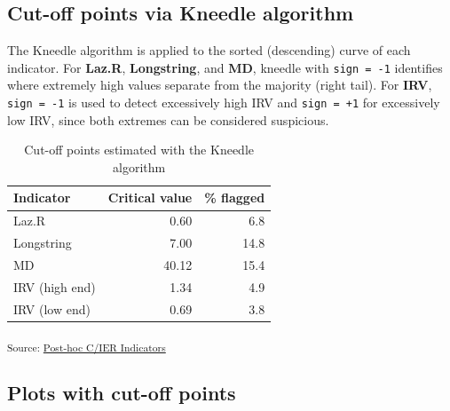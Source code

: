 \documentclass[
  letterpaper,
  DIV=11,
  numbers=noendperiod]{scrartcl}
\begin{document}
\subsection{Cut-off points via Kneedle
algorithm}\label{cut-off-points-via-kneedle-algorithm}

The Kneedle algorithm is applied to the sorted (descending) curve of
each indicator. For \textbf{Laz.R}, \textbf{Longstring}, and
\textbf{MD}, kneedle with \texttt{sign\ =\ -1} identifies where
extremely high values separate from the majority (right tail). For
\textbf{IRV}, \texttt{sign\ =\ -1} is used to detect excessively high
IRV and \texttt{sign\ =\ +1} for excessively low IRV, since both
extremes can be considered suspicious.

{

\begin{longtable}[]{@{}lrr@{}}

\caption{\label{tbl-kneedle-cutoffs}Cut-off points estimated with the
Kneedle algorithm}

\tabularnewline

\toprule\noalign{}
Indicator & Critical value & \% flagged \\
\midrule\noalign{}
\endhead
\bottomrule\noalign{}
\endlastfoot
Laz.R & 0.60 & 6.8 \\
Longstring & 7.00 & 14.8 \\
MD & 40.12 & 15.4 \\
IRV (high end) & 1.34 & 4.9 \\
IRV (low end) & 0.69 & 3.8 \\

\end{longtable}

}

\textsubscript{Source:
\href{https://phdpablo.github.io/cier/Scripts/ProcessingScripts/02_posthoc-preview.html\#cell-tbl-kneedle-cutoffs}{Post-hoc
C/IER Indicators}}

\subsection{Plots with cut-off points}\label{plots-with-cut-off-points}
\end{document}
